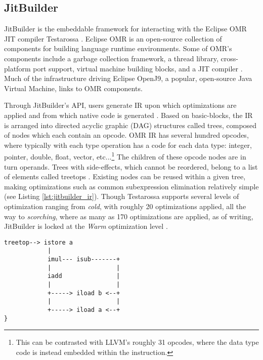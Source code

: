 \subsection{JitBuilder}
JitBuilder is the embeddable framework for interacting with the Eclipse OMR JIT compiler Testarossa \cite{jitbuilderPaper}.
Eclipse OMR is an open-source collection of components for building language runtime environments.
Some of OMR's components include a garbage collection framework, a thread library, cross-platform port support, virtual machine building blocks, and a JIT compiler \cite{eclipseOMR,RebuildingAirliner}.
Much of the infrastructure driving Eclipse OpenJ9, a popular, open-source Java Virtual Machine, links to OMR components.

Through JitBuilder's API, users generate IR upon which optimizations are applied and from which native code is generated \cite{SuganumaIBMJit}.
Based on basic-blocks, the IR is arranged into directed acyclic graphic (DAG) structures called trees, composed of nodes which each contain an opcode.
OMR IR has several hundred opcodes, where typically with each type operation has a code for each data type: integer, pointer, double, float, vector, etc...\footnote{
    This can be contrasted with LLVM's roughly 31 opcodes, where the data type code is instead embedded within the instruction.
}
The children of these opcode nodes are in turn operands.
Trees with side-effects, which cannot be reordered, belong to a list of elements called treetops \cite{treetops}.
Existing nodes can be reused within a given tree, making optimizations such as common subexpression elimination relatively simple (see Listing \ref{lst:jitbuilder_ir}).
Though Testarossa supports several levels of optimization ranging from \textit{cold}, with roughly 20 optimizations applied, all the way to \textit{scorching}, where as many as 170 optimizations are applied, as of writing, JitBuilder is locked at the \textit{Warm} optimization level \cite{sanchez2011using, jitbuilderWarm}.
\begin{lstlisting}[float,floatplacement=H,
caption={OMR IR representation for (a+b)*(a-b). Note that the iload nodes are reused \cite{treetops}.},
label=lst:jitbuilder_ir]
treetop--> istore a
            |
            imul--- isub-------+
            |                  |
            iadd               |
            |                  |
            +-----> iload b <--+
            |                  |
            +-----> iload a <--+
}\end{lstlisting}

